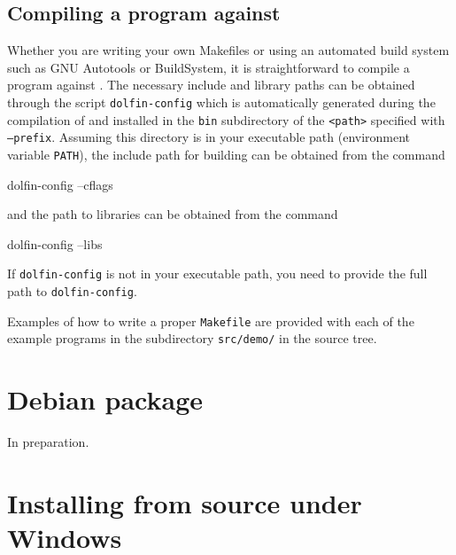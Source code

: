 \subsection{Compiling a program against \dolfin{}}

Whether you are writing your own Makefiles or using an automated build
system such as GNU Autotools or BuildSystem, it is straightforward to
compile a program against \dolfin{}. The necessary include and library
paths can be obtained through the script \texttt{dolfin-config} which
is automatically generated during the compilation of \dolfin{} and
installed in the \texttt{bin} subdirectory of the \texttt{<path>}
specified with \texttt{--prefix}. Assuming this directory is in your
executable path (environment variable \texttt{PATH}), the include
path for building \dolfin{} can be obtained from the command
\begin{code}
dolfin-config --cflags
\end{code}
and the path to \dolfin{} libraries can be obtained from the command
\begin{code}
dolfin-config --libs
\end{code}
If \texttt{dolfin-config} is not in your executable path, you need to
provide the full path to \texttt{dolfin-config}.

Examples of how to write a proper \texttt{Makefile} are provided with
each of the example programs in the subdirectory \texttt{src/demo/} in
the \dolfin{} source tree.

\section{Debian package}

In preparation.

\section{Installing from source under Windows}
\label{app:cygwin}

